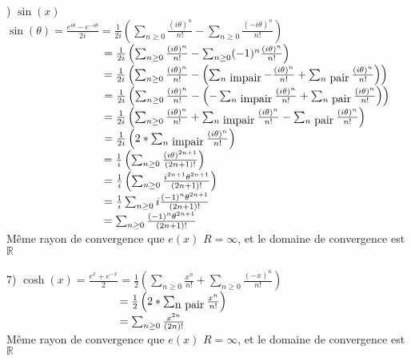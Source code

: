 \documentclass{article}
\newcommand\tab[1][1cm]{\hspace*{#1}}
\begin{document}
\newpage
{}) $\sin(x)$\\
$\sin(\theta) = \frac{e^{i \theta} - e^{-i \theta}}{2i} = \frac{1}{2i} \left(\sum_{n \geq 0} \frac{(i \theta)^n}{n!} - \sum_{n \geq 0} \frac{(-i \theta)^n}{n!}\right)$\\
$\tab[3.05cm] = \frac{1}{2i} \left(\sum_{n \geq 0} \frac{(i \theta)^n}{n!} - \sum_{n \geq 0} (-1)^n \frac{(i \theta)^n}{n!}\right)$\\
$\tab[3.05cm] = \frac{1}{2i} \left(\sum_{n \geq 0} \frac{(i \theta)^n}{n!} - \left(\sum_{n \mbox{ impair}} -\frac{(i \theta)^n}{n!} + \sum_{n \mbox{ pair}} \frac{(i \theta)^n}{n!}\right)\right)$\\
$\tab[3.05cm] = \frac{1}{2i} \left(\sum_{n \geq 0} \frac{(i \theta)^n}{n!} - \left(-\sum_{n \mbox{ impair}} \frac{(i \theta)^n}{n!} + \sum_{n \mbox{ pair}} \frac{(i \theta)^n}{n!}\right)\right)$\\
$\tab[3.05cm] = \frac{1}{2i} \left(\sum_{n \geq 0} \frac{(i \theta)^n}{n!} + \sum_{n \mbox{ impair}} \frac{(i \theta)^n}{n!} - \sum_{n \mbox{ pair}} \frac{(i \theta)^n}{n!}\right)$\\
$\tab[3.05cm] = \frac{1}{2i} \left(2 * \sum_{n \mbox{ impair}} \frac{(i \theta)^n}{n!}\right)$\\
$\tab[3.05cm] = \frac{1}{i} \left(\sum_{n \geq 0} \frac{(i \theta)^{2n + 1}}{(2n + 1)!}\right)$\\
$\tab[3.05cm] = \frac{1}{i} \left(\sum_{n \geq 0} \frac{i^{2n + 1}\theta^{2n + 1}}{(2n + 1)!}\right)$\\
$\tab[3.05cm] = \frac{1}{i} \sum_{n \geq 0} i\frac{(-1)^{n}\theta^{2n + 1}}{(2n + 1)!}$\\
$\tab[3.05cm] = \sum_{n \geq 0} \frac{(-1)^{n}\theta^{2n + 1}}{(2n + 1)!}$\\
Même rayon de convergence que $e(x)$ $R = \infty$, et le domaine de convergence est $\mathbb{R}$\\
\\
7) $\cosh(x) =  \frac{e^{x} + e^{-x}}{2} = \frac{1}{2} \left(\sum_{n \geq 0} \frac{x^n}{n!} + \sum_{n \geq 0} \frac{(-x)^n}{n!}\right)$\\
$\tab[3.55cm] = \frac{1}{2} \left(2 * \sum_{\mbox{n pair}} \frac{x^n}{n!} \right)$\\
$\tab[3.55cm] = \sum_{n \geq 0} \frac{x^{2n}}{{(2n)}!}$\\
Même rayon de convergence que $e(x)$ $R = \infty$, et le domaine de convergence est $\mathbb{R}$
\end{document}
